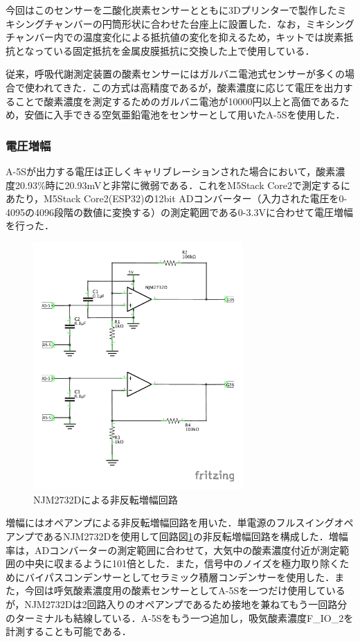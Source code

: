今回はこのセンサーを二酸化炭素センサーとともに3Dプリンターで製作したミキシングチャンバーの円筒形状に合わせた台座上に設置した．なお，ミキシングチャンバー内での温度変化による抵抗値の変化を抑えるため，キットでは炭素抵抗となっている固定抵抗を金属皮膜抵抗に交換した上で使用している．

従来，呼吸代謝測定装置の酸素センサーにはガルバニ電池式センサーが多くの場合で使われてきた．この方式は高精度であるが，酸素濃度に応じて電圧を出力することで酸素濃度を測定するためのガルバニ電池が10000円以上と高価であるため，安価に入手できる空気亜鉛電池をセンサーとして用いたA-5Sを使用した．

\subsubsection{電圧増幅}

A-5Sが出力する電圧は正しくキャリブレーションされた場合において，酸素濃度20.93\%時に20.93mVと非常に微弱である．これをM5Stack Core2で測定するにあたり，M5Stack Core2(ESP32)の12bit ADコンバーター（入力された電圧を0-4095の4096段階の数値に変換する）の測定範囲である0-3.3Vに合わせて電圧増幅を行った．

\begin{figure}[H]
  \begin{center}
    \includegraphics[width=8cm]{fig/a-5s_opamp_schematic}
    \caption{NJM2732Dによる非反転増幅回路}
    \label{fig:a-5s_opamp_schematic}
  \end{center}
\end{figure}

増幅にはオペアンプによる非反転増幅回路を用いた．単電源のフルスイングオペアンプであるNJM2732Dを使用して回路図\ref{fig:a-5s_opamp_schematic}の非反転増幅回路を構成した．増幅率は，ADコンバーターの測定範囲に合わせて，大気中の酸素濃度付近が測定範囲の中央に収まるように101倍とした．また，信号中のノイズを極力取り除くためにバイパスコンデンサーとしてセラミック積層コンデンサーを使用した．また，今回は呼気酸素濃度用の酸素センサーとしてA-5Sを一つだけ使用しているが，NJM2732Dは2回路入りのオペアンプであるため接地を兼ねてもう一回路分のターミナルも結線している．A-5Sをもう一つ追加し，吸気酸素濃度F_IO_2を計測することも可能である．

